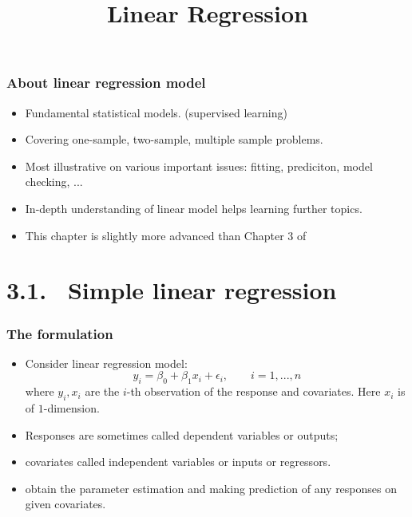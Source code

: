 \documentclass{beamer}
\title[Chapter 3]{Linear Regression}
\author{ }
\institute[ ]
{
	Chapter 3 \\ 
	\medskip
	\textit{ } 
}
\begin{document}
	 	
	 	\begin{frame}
	 		\titlepage %
	 	\end{frame}
	
 \begin{frame}
 	\frametitle{ }
 	\tableofcontents
 \end{frame}
 

 

 

 
     
     
      
      
      \begin{frame}
      	\frametitle{About linear regression model}
      	\begin{itemize}
      		\item  Fundamental statistical models. (supervised learning)
      		\item  Covering one-sample, two-sample, multiple sample problems.
      		\item  Most illustrative on various important issues: fitting, prediciton, model checking, ...
      		\item  In-depth understanding of linear model helps learning further topics.
      		\item  This chapter is slightly more advanced than Chapter 3 of 	
      	\end{itemize}
      \end{frame}
      
      \section{3.1.  \ Simple linear regression}
      
      
      
      \begin{frame}
      	\frametitle{The formulation}
      	\begin{itemize}	 
      		\item  Consider linear regression model:
      		$$y_i = \beta_0 + \beta_1 x_{i} +  \epsilon_i, \qquad i=1,..., n  $$
      		where $y_i, x_i $ are the $i$-th observation of the response
      		and covariates. Here $x_i$ is of $1$-dimension.
      		\item Responses are sometimes called dependent variables or outputs;
      		\item  covariates called independent variables or inputs or regressors.
      		\item  obtain the parameter estimation and
      		making prediction of any responses on given covariates. 
      		
      	\end{itemize}
      \end{frame}
      
\end{document}
